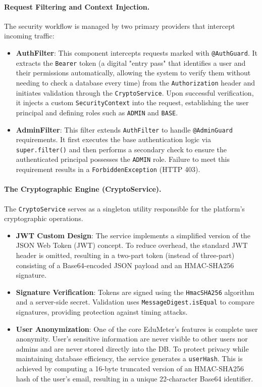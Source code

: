 \paragraph{Request Filtering and Context Injection.} The security workflow is managed by two primary providers that intercept incoming traffic:
\begin{itemize}
	\item \textbf{AuthFilter}: This component intercepts requests marked with \texttt{@AuthGuard}. It extracts the \texttt{Bearer} token (a digital "entry pass" that identifies a user and their permissions automatically, allowing the system to verify them without needing to check a database every time) from the \texttt{Authorization} header and initiates validation through the \texttt{CryptoService}. Upon successful verification, it injects a custom \texttt{SecurityContext} into the request, establishing the user principal and defining roles such as \texttt{ADMIN} and \texttt{BASE}.
	\item \textbf{AdminFilter}: This filter extends \texttt{AuthFilter} to handle \texttt{@AdminGuard} requirements. It first executes the base authentication logic via \texttt{super.filter()} and then performs a secondary check to ensure the authenticated principal possesses the \texttt{ADMIN} role. Failure to meet this requirement results in a \texttt{ForbiddenException} (HTTP 403).
\end{itemize}

\paragraph{The Cryptographic Engine (CryptoService).}
The \texttt{CryptoService} serves as a singleton utility responsible for the platform's cryptographic operations.
\begin{itemize}
	\item \textbf{JWT Custom Design}: The service implements a simplified version of the JSON Web Token (JWT) concept. To reduce overhead, the standard JWT header is omitted, resulting in a two-part token (instead of three-part) consisting of a Base64-encoded JSON payload and an HMAC-SHA256 signature.
	\item \textbf{Signature Verification}: Tokens are signed using the \texttt{HmacSHA256} algorithm and a server-side secret. Validation uses \texttt{MessageDigest.isEqual} to compare signatures, providing protection against timing attacks.
	\item \textbf{User Anonymization}: One of the core EduMeter's features is complete user anonymity. User's sensitive information are never visible to other users nor admins and are never stored directly into the DB. To protect privacy while maintaining database efficiency, the service generates a \texttt{userHash}. This is achieved by computing a 16-byte truncated version of an HMAC-SHA256 hash of the user's email, resulting in a unique 22-character Base64 identifier.
\end{itemize}

